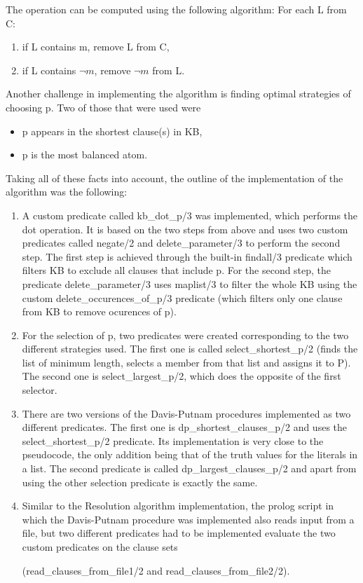 \documentclass{article}
\begin{document}
The operation can be computed using the following algorithm: For each L from C:
\begin{enumerate}
	\item if L contains m, remove L from C,
	\item if L contains $\neg m$, remove $\neg m$ from L.
\end{enumerate}

Another challenge in implementing the algorithm is finding optimal strategies of choosing p. Two of those that were used were
\begin{itemize}
	\item p appears in the shortest clause(s) in KB,
	\item p is the most balanced atom.
\end{itemize}

Taking all of these facts into account, the outline of the implementation of the algorithm was the following:
\begin{enumerate}
	\item A custom predicate called kb\_dot\_p/3 was implemented, which performs the dot operation. It is based on the two steps from above and uses two custom predicates called negate/2 and delete\_parameter/3 to perform the second step. The first step is achieved through the built-in findall/3\cite{findallpred} predicate which filters KB to exclude all clauses that include p. For the second step, the predicate delete\_parameter/3 uses maplist/3\cite{maplistpred} to filter the whole KB using the custom delete\_occurences\_of\_p/3 predicate (which filters only one clause from KB to remove ocurences of p).
	\item For the selection of p, two predicates were created corresponding to the two different strategies used. The first one is called select\_shortest\_p/2 (finds the list of minimum length, selects a member from that list and assigns it to P). The second one is select\_largest\_p/2, which does the opposite of the first selector. 
	\item There are two versions of the Davis-Putnam procedures implemented as two different predicates. The first one is dp\_shortest\_clauses\_p/2 and uses the select\_shortest\_p/2 predicate. Its implementation is very close to the pseudocode, the only addition being that of the truth values for the literals in a list. The second predicate is called dp\_largest\_clauses\_p/2 and apart from using the other selection predicate is exactly the same.
	\item Similar to the Resolution algorithm implementation, the prolog script in which the Davis-Putnam procedure was implemented also reads input from a file, but two different predicates had to be implemented evaluate the two custom predicates on the clause sets 
	
	(read\_clauses\_from\_file1/2 and read\_clauses\_from\_file2/2).
\end{enumerate}
\end{document}
